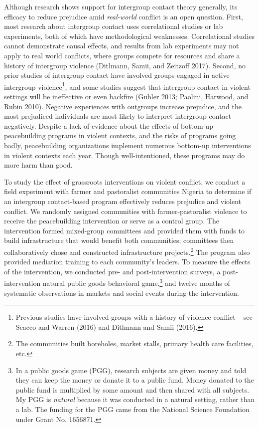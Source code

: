 \documentclass[11pt]{article}
\begin{document}
Although research shows support for intergroup contact theory generally,
its efficacy to reduce prejudice amid \emph{real-world} conflict is an
open question. First, most research about intergroup contact uses
correlational studies or lab experiments, both of which have
methodological weaknesses. Correlational studies cannot demonstrate
causal effects, and results from lab experiments may not apply to real
world conflicts, where groups compete for resources and share a history
of intergroup violence (Ditlmann, Samii, and Zeitzoff 2017). Second, no
prior studies of intergroup contact have involved groups engaged in
active intergroup violence\footnote{Previous studies have involved
  groups with a history of violence conflict -- see Scacco and Warren
  (2016) and Ditlmann and Samii (2016).}, and some studies suggest that
intergroup contact in violent settings will be ineffective or even
backfire (Gubler 2013; Paolini, Harwood, and Rubin 2010). Negative
experiences with outgroups increase prejudice, and the most prejudiced
individuals are most likely to interpret intergroup contact negatively.
Despite a lack of evidence about the effects of bottom-up peacebuilding
programs in violent contexts, and the risks of programs going badly,
peacebuilding organizations implement numerous bottom-up interventions
in violent contexts each year. Though well-intentioned, these programs
may do more harm than good.

To study the effect of grassroots interventions on violent conflict, we
conduct a field experiment with farmer and pastoralist communities
Nigeria to determine if an intergroup contact-based program effectively
reduces prejudice and violent conflict. We randomly assigned communities
with farmer-pastoralist violence to receive the peacebuilding
intervention or serve as a control group. The intervention formed
mixed-group committees and provided them with funds to build
infrastructure that would benefit both communities; committees then
collaboratively chose and constructed infrastructure projects.\footnote{The
  communities built boreholes, market stalls, primary health care
  facilities, etc.} The program also provided mediation training to each
community's leaders. To measure the effects of the intervention, we
conducted pre- and post-intervention surveys, a post-intervention
natural public goods behavioral game,\footnote{In a public goods game
  (PGG), research subjects are given money and told they can keep the
  money or donate it to a public fund. Money donated to the public fund
  is multiplied by some amount and then shared with all subjects. My PGG
  is \emph{natural} because it was conducted in a natural setting,
  rather than a lab. The funding for the PGG came from the National
  Science Foundation under Grant No. 1656871.} and twelve months of
systematic observations in markets and social events during the
intervention.
\end{document}
